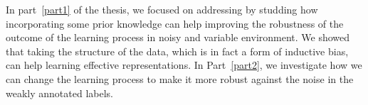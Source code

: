 \bigskip
In part~\ref{part1} of the thesis, we focused on addressing \textbf{} by studding how incorporating some prior knowledge can help improving the robustness of the outcome of the learning process in noisy and variable environment. We showed that taking the structure of the data, which is in fact a form of inductive bias, can help learning effective representations. In Part~\ref{part2}, we investigate how we can change the learning process to make it more robust against the noise in the weakly annotated labels.